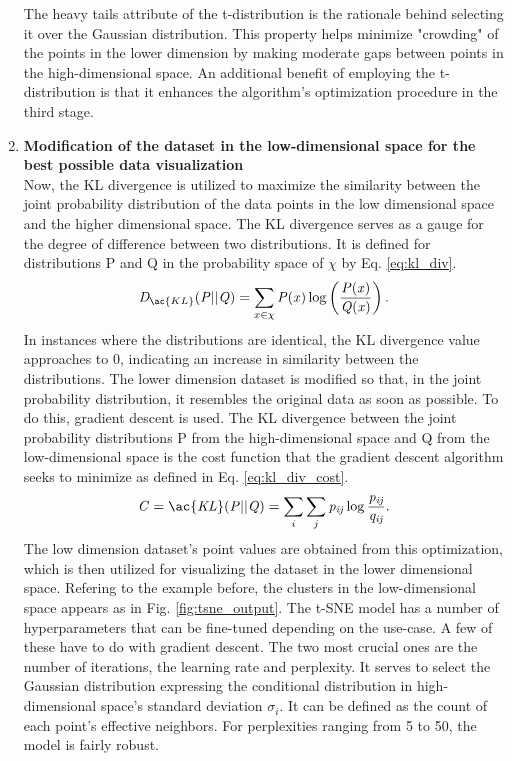 \begin{enumerate}
\begin{equation}
    \end{equation}
    The heavy tails attribute of the t-distribution is the rationale behind selecting it over the Gaussian distribution. This property helps minimize "crowding" of the points in the lower dimension by making moderate gaps between points in the high-dimensional space. An additional benefit of employing the t-distribution is that it enhances the algorithm's optimization procedure in the third stage.\cite{van2008visualizing}
    \item \textbf{Modification of the dataset in the low-dimensional space for the best possible data visualization}\\
    Now, the \ac{KL} divergence is utilized to maximize the similarity between the joint probability distribution of the data points in the low dimensional space and the higher dimensional space. The \ac{KL} divergence serves as a gauge for the degree of difference between two distributions. It is defined for distributions P and Q in the probability space of $\chi$ by Eq. \ref{eq:kl_div}.
    \begin{equation}
        \label{eq:kl_div}
        \mathit{D}_{\ac{KL}}(\mathit{P} || \mathit{Q}) = \sum_{x \in \chi} \mathit{P(x)} \log \left( \frac{\mathit{P(x)}}{\mathit{Q(x)}} \right).
    \end{equation}
    In instances where the distributions are identical, the KL divergence value approaches to 0, indicating an increase in similarity between the distributions. The lower dimension dataset is modified so that, in the joint probability distribution, it resembles the original data as soon as possible. To do this, gradient descent is used. The KL divergence between the joint probability distributions P from the high-dimensional space and Q from the low-dimensional space is the cost function that the gradient descent algorithm seeks to minimize as defined in Eq. \ref{eq:kl_div_cost}.
    \begin{equation}
        \label{eq:kl_div_cost}
        \mathit{C} = \mathit{\ac{KL}(P || Q)} = \sum_i \sum_j \mathit{p_{ij}} \log \mathit{\frac{p_{ij}}{q_{ij}}}.
    \end{equation}
    The low dimension dataset's point values are obtained from this optimization, which is then utilized for visualizing the dataset in the lower dimensional space. Refering to the example before, the clusters in the low-dimensional space appears as in Fig. \ref{fig:tsne_output}. The \ac{t-SNE} model has a number of hyperparameters that can be fine-tuned depending on the use-case. A few of these have to do with gradient descent. The two most crucial ones are the number of iterations, the learning rate and perplexity. It serves to select the Gaussian distribution expressing the conditional distribution in high-dimensional space's standard deviation $\sigma_i$. It can be defined as the count of each point's effective neighbors. For perplexities ranging from 5 to 50, the model is fairly robust.\cite{van2008visualizing}

\end{enumerate}

